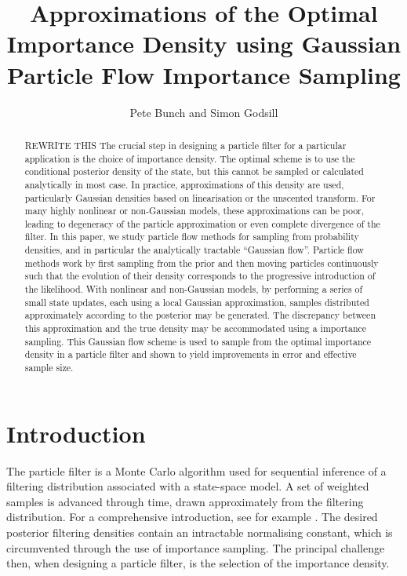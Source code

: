 \documentclass{article}
\title{Approximations of the Optimal Importance Density using Gaussian Particle Flow Importance Sampling}
\author{Pete Bunch and Simon Godsill}
\date{}
\begin{document}
\maketitle

\begin{abstract}
{\meta REWRITE THIS}
The crucial step in designing a particle filter for a particular application is the choice of importance density. The optimal scheme is to use the conditional posterior density of the state, but this cannot be sampled or calculated analytically in most case. In practice, approximations of this density are used, particularly Gaussian densities based on linearisation or the unscented transform. For many highly nonlinear or non-Gaussian models, these approximations can be poor, leading to degeneracy of the particle approximation or even complete divergence of the filter. In this paper, we study particle flow methods for sampling from probability densities, and in particular the analytically tractable ``Gaussian flow''. Particle flow methods work by first sampling from the prior and then moving particles continuously such that the evolution of their density corresponds to the progressive introduction of the likelihood. With nonlinear and non-Gaussian models, by performing a series of small state updates, each using a local Gaussian approximation, samples distributed approximately according to the posterior may be generated. The discrepancy between this approximation and the true density may be accommodated using a importance sampling. This Gaussian flow scheme is used to sample from the optimal importance density in a particle filter and shown to yield improvements in error and effective sample size.
\end{abstract}






\section{Introduction}

The particle filter is a Monte Carlo algorithm used for sequential inference of a filtering distribution associated with a state-space model. A set of weighted samples is advanced through time, drawn approximately from the filtering distribution. For a comprehensive introduction, see for example \citep{Cappe2007,Doucet2009}. The desired posterior filtering densities contain an intractable normalising constant, which is circumvented through the use of importance sampling. The principal challenge then, when designing a particle filter, is the selection of the importance density.
\end{document}
